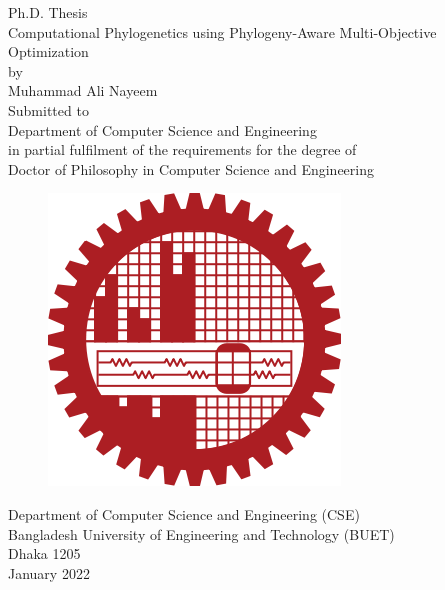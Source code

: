 \begin{titlepage}
\centering 
 {\sc \Large Ph.D. Thesis} \\
 \vspace{1 cm}
 {\huge Computational Phylogenetics using Phylogeny-Aware Multi-Objective Optimization}\\
 \vspace{0.5 cm}
 {\Large by \\
 Muhammad Ali Nayeem}\\
 \vspace{3cm}
 {\Large Submitted to}\\
 {\Large Department of Computer Science and Engineering\\
 in partial fulfilment of the requirements for the degree of \\
 Doctor of Philosophy in Computer Science and Engineering} \\
 \vspace{1cm}
 \begin{figure}[h] 
 \centering
 \includegraphics[scale=0.2]{buet_logo}
 \end{figure}
 \vspace{0.4cm}
 {\Large Department of Computer Science and Engineering (CSE)\\
 	Bangladesh University of Engineering and Technology (BUET)\\
 	Dhaka 1205 \\
 }
 \vspace{0.5cm}
 {\Large January 2022}
\end{titlepage}
 \newpage
 
